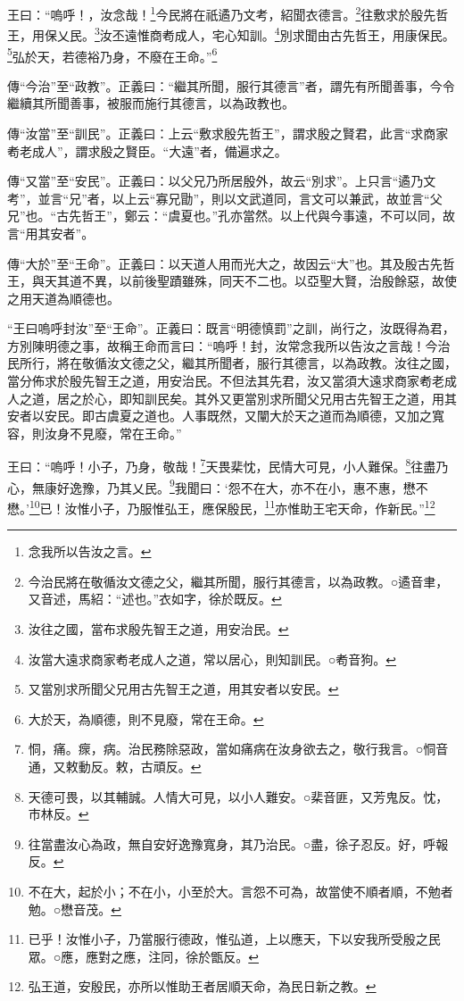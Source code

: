王曰：“嗚呼！，汝念哉！\footnote{念我所以告汝之言。}今民將在祇遹乃文考，紹聞衣德言。\footnote{今治民將在敬循汝文德之父，繼其所聞，服行其德言，以為政教。○遹音聿，又音述，馬紹：“述也。”衣如字，徐於既反。}往敷求於殷先哲王，用保乂民。\footnote{汝往之國，當布求殷先智王之道，用安治民。}汝丕遠惟商耇成人，宅心知訓。\footnote{汝當大遠求商家耇老成人之道，常以居心，則知訓民。○耇音狗。}別求聞由古先哲王，用康保民。\footnote{又當別求所聞父兄用古先智王之道，用其安者以安民。}弘於天，若德裕乃身，不廢在王命。”\footnote{大於天，為順德，則不見廢，常在王命。}


{\noindent\zhuan{}\fzbyks 傳“今治”至“政教”。正義曰：“繼其所聞，服行其德言”者，謂先有所聞善事，今令繼續其所聞善事，被服而施行其德言，以為政教也。 \par}

{\noindent\zhuan{}\fzbyks 傳“汝當”至“訓民”。正義曰：上云“敷求殷先哲王”，謂求殷之賢君，此言“求商家耇老成人”，謂求殷之賢臣。“大遠”者，備遍求之。 \par}

{\noindent\zhuan{}\fzbyks 傳“又當”至“安民”。正義曰：以父兄乃所居殷外，故云“別求”。上只言“遹乃文考”，並言“兄”者，以上云“寡兄勖”，則以文武道同，言文可以兼武，故並言“父兄”也。“古先哲王”，鄭云：“虞夏也。”孔亦當然。以上代與今事遠，不可以同，故言“用其安者”。 \par}

{\noindent\zhuan{}\fzbyks 傳“大於”至“王命”。正義曰：以天道人用而光大之，故因云“大”也。其及殷古先哲王，與天其道不異，以前後聖蹟雖殊，同天不二也。以亞聖大賢，治殷餘惡，故使之用天道為順德也。 \par}

{\noindent\shu{}\fzkt “王曰嗚呼封汝”至“王命”。正義曰：既言“明德慎罰”之訓，尚行之，汝既得為君，方別陳明德之事，故稱王命而言曰：“嗚呼！封，汝常念我所以告汝之言哉！今治民所行，將在敬循汝文德之父，繼其所聞者，服行其德言，以為政教。汝往之國，當分佈求於殷先智王之道，用安治民。不但法其先君，汝又當須大遠求商家耇老成人之道，居之於心，即知訓民矣。其外又更當別求所聞父兄用古先智王之道，用其安者以安民。即古虞夏之道也。人事既然，又闡大於天之道而為順德，又加之寬容，則汝身不見廢，常在王命。” \par}

王曰：“嗚呼！小子，乃身，敬哉！\footnote{恫，痛。瘝，病。治民務除惡政，當如痛病在汝身欲去之，敬行我言。○恫音通，又敕動反。敕，古頑反。}天畏棐忱，民情大可見，小人難保。\footnote{天德可畏，以其輔誠。人情大可見，以小人難安。○棐音匪，又芳鬼反。忱，巿林反。}往盡乃心，無康好逸豫，乃其乂民。\footnote{往當盡汝心為政，無自安好逸豫寬身，其乃治民。○盡，徐子忍反。好，呼報反。}我聞曰：‘怨不在大，亦不在小，惠不惠，懋不懋。’\footnote{不在大，起於小；不在小，小至於大。言怨不可為，故當使不順者順，不勉者勉。○懋音茂。}已！汝惟小子，乃服惟弘王，應保殷民，\footnote{已乎！汝惟小子，乃當服行德政，惟弘道，上以應天，下以安我所受殷之民眾。○應，應對之應，注同，徐於甑反。}亦惟助王宅天命，作新民。”\footnote{弘王道，安殷民，亦所以惟助王者居順天命，為民日新之教。}



